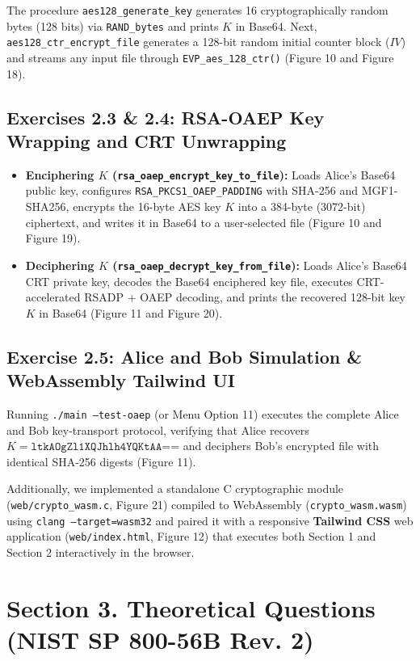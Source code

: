 \documentclass[10pt,twocolumn,letterpaper]{article}
\begin{document}
The procedure \texttt{aes128\_generate\_key} generates 16 cryptographically random bytes (128 bits) via \texttt{RAND\_bytes} and prints $K$ in Base64. Next, \texttt{aes128\_ctr\_encrypt\_file} generates a 128-bit random initial counter block ($IV$) and streams any input file through \texttt{EVP\_aes\_128\_ctr()} (Figure 10 and Figure 18).

\subsection{Exercises 2.3 \& 2.4: RSA-OAEP Key Wrapping and CRT Unwrapping}

\begin{itemize}
    \item \textbf{Enciphering $K$ (\texttt{rsa\_oaep\_encrypt\_key\_to\_file}):} Loads Alice's Base64 public key, configures \texttt{RSA\_PKCS1\_OAEP\_PADDING} with SHA-256 and MGF1-SHA256, encrypts the 16-byte AES key $K$ into a 384-byte (3072-bit) ciphertext, and writes it in Base64 to a user-selected file (Figure 10 and Figure 19).
    \item \textbf{Deciphering $K$ (\texttt{rsa\_oaep\_decrypt\_key\_from\_file}):} Loads Alice's Base64 CRT private key, decodes the Base64 enciphered key file, executes CRT-accelerated RSADP + OAEP decoding, and prints the recovered 128-bit key $K$ in Base64 (Figure 11 and Figure 20).
\end{itemize}

\subsection{Exercise 2.5: Alice and Bob Simulation \& WebAssembly Tailwind UI}

Running \texttt{./main --test-oaep} (or Menu Option 11) executes the complete Alice and Bob key-transport protocol, verifying that Alice recovers $K = \texttt{ltkAOgZl1XQJhlh4YQKtAA==}$ and deciphers Bob's encrypted file with identical SHA-256 digests (Figure 11).

Additionally, we implemented a standalone C cryptographic module (\texttt{web/crypto\_wasm.c}, Figure 21) compiled to WebAssembly (\texttt{crypto\_wasm.wasm}) using \texttt{clang --target=wasm32} and paired it with a responsive \textbf{Tailwind CSS} web application (\texttt{web/index.html}, Figure 12) that executes both Section 1 and Section 2 interactively in the browser.

\section{Section 3. Theoretical Questions (NIST SP 800-56B Rev. 2)}
\end{document}
